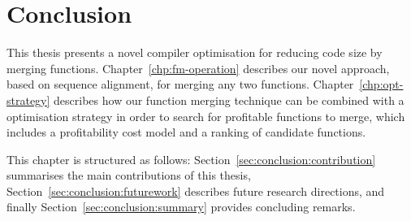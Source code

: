 
\chapter{Conclusion}

This thesis presents a novel compiler optimisation for reducing code size by merging functions.
Chapter~\ref{chp:fm-operation} describes our novel approach, based on sequence alignment, for merging any two functions.
Chapter~\ref{chp:opt-strategy} describes how our function merging technique can be combined with a optimisation strategy in order to search for profitable functions to merge, which includes a profitability cost model and a ranking of candidate functions.

This chapter is structured as follows:
Section~\ref{sec:conclusion:contribution} summarises the main contributions of this thesis,
Section~\ref{sec:conclusion:futurework} describes future research directions,
and finally Section~\ref{sec:conclusion:summary}  provides concluding remarks.






